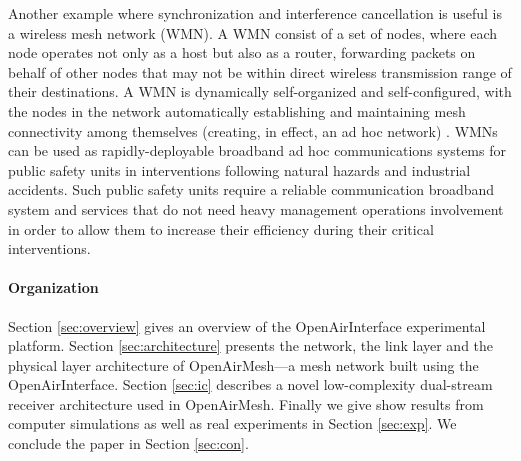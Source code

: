 \documentclass[a4paper,twocolumn,journal]{IEEEtran}
\begin{document}

Another example where synchronization and interference cancellation is useful is a wireless mesh network (WMN). A WMN consist of a set of nodes, where each node operates not only as a host but also as a router, forwarding packets on behalf of other nodes that may not be within direct wireless transmission range of their destinations. A WMN is dynamically self-organized and self-configured, with the nodes in the network automatically establishing and maintaining mesh connectivity among themselves (creating, in effect, an ad hoc network) \cite{akyildiz05wireless}. WMNs can be used as rapidly-deployable broadband ad hoc communications systems for public safety units in interventions following natural hazards and industrial accidents. Such public safety units require a reliable communication broadband system and services that do not need heavy management operations involvement in order to allow them to increase their efficiency during their critical interventions.  



\paragraph*{Organization} 
Section \ref{sec:overview} gives an overview of the OpenAirInterface experimental platform. Section \ref{sec:architecture} presents the network, the link layer and the physical layer architecture of OpenAirMesh---a mesh network built using the OpenAirInterface. Section \ref{sec:ic} describes a novel low-complexity dual-stream receiver architecture used in OpenAirMesh. Finally we give show results from computer simulations as well as real experiments in Section \ref{sec:exp}. We conclude the paper in Section \ref{sec:con}. 
\end{document}
